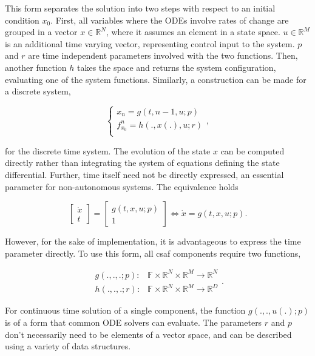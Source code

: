 This form separates the solution into two steps with respect to an initial condition $x_0$. First, all variables where the ODEs involve rates of change are grouped in a vector $x \in \mathbb R^N$, where it assumes an element in a state space. $u \in \mathbb R^M$ is an additional time varying vector, representing control input to the system. $p$ and $r$ are time independent parameters involved with the two functions. Then, another function $h$ takes the space and returns the system configuration, evaluating one of the system functions. Similarly, a construction can be made for a discrete system,

\begin{equation}
\begin{cases}
x_{n} = g(t, n-1, u; p)\\
f^{n}_{x_0} = h(., x(.), u; r) \\
\end{cases},
\end{equation}

for the discrete time system. The evolution of the state $x$ can be computed directly rather than integrating the system of equations defining the state differential. Further, time itself need not be directly expressed, an essential parameter for non-autonomous systems. The equivalence holds

\begin{equation}
\begin{bmatrix}
\dot x \\
t
\end{bmatrix} = 
\begin{bmatrix}
g(t, x, u; p) \\
1
\end{bmatrix} \iff \dot x = g(t, x, u;p) .
\end{equation}

However, for the sake of implementation, it is advantageous to express the time parameter directly. To use this form, all \acrshort{csaf}  components require two functions, 

\begin{equation}
\begin{aligned}
g(.,.,.;p):& \mathbb F \times \mathbb R^N \times \mathbb R^M \rightarrow \mathbb R^N \\
h(.,.,.;r):& \mathbb F \times \mathbb R^N \times \mathbb R^M \rightarrow \mathbb R^D
\end{aligned}.
\end{equation}

For continuous time solution of a single component, the function $g(.,.,u(.);p)$ is of a form that common ODE solvers can evaluate. The parameters $r$ and $p$ don't necessarily need to be elements of a vector space, and can be described using a variety of data structures.

